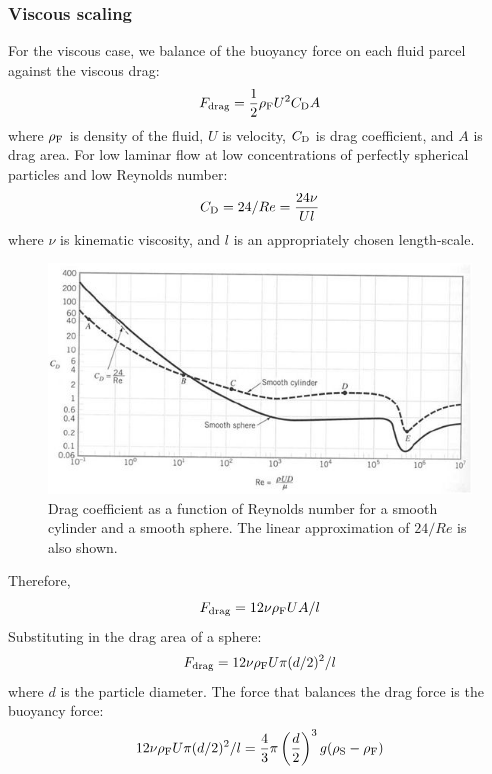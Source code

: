 \subsubsection{Viscous scaling}
For the viscous case, we balance of the buoyancy force on each fluid parcel against the viscous drag:
\begin{equation}
F_{\rm drag} = \frac{1}{2} \rho_{\rm F} U^2 C_{\rm D} A
\end{equation}
where $\rho_{\rm F}$ is density of the fluid, $U$ is velocity, $C_{\rm D}$ is drag coefficient, and $A$ is drag area.
For low laminar flow at low concentrations of perfectly spherical particles and low Reynolds number:
\begin{equation}
C_{\rm D} = 24 / Re = \frac{24 \nu}{U l}
\end{equation}
where $\nu$ is kinematic viscosity, and $l$ is an appropriately chosen length-scale.
\begin{figure}[!bthp]
\centering
\includegraphics[width=1.0\textwidth]{figs/Shape_CoefficientC.jpg}
\caption{Drag coefficient as a function of Reynolds number for a smooth cylinder and a smooth sphere.  The linear approximation of $24/Re$ is also shown.}
\end{figure}
Therefore,
\begin{equation}
F_{\rm drag} = 12 \nu \rho_{\rm F} U A / l
\end{equation}
Substituting in the drag area of a sphere:
\begin{equation}
F_{\rm drag} = 12 \nu \rho_{\rm F} U \pi (d/2)^2 / l
\end{equation}
where $d$ is the particle diameter.
The force that balances the drag force is the buoyancy force:
\begin{equation}
12 \nu \rho_{\rm F} U \pi (d/2)^2 / l = \frac{4}{3} \pi \left(\frac{d}{2}\right)^3 g (\rho_{\rm S} - \rho_{\rm F})
\end{equation}
